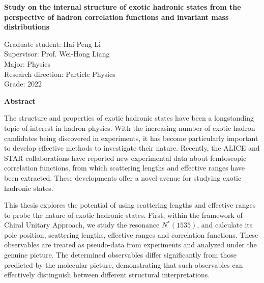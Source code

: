\begin{center}
\sanhao\bf Study on the internal structure of exotic hadronic states from the perspective of hadron correlation functions and invariant mass distributions
\end{center}
\vspace{0.7cm}
Graduate student: Hai-Peng Li\\
Supervisor: Prof. Wei-Hong Liang\\
Major: Physics\\
Research direction: Particle Physics\\
Grade: 2022\\
\vspace{0.5cm}
\centerline{\bf\xiaosanhao Abstract}
\vspace{-1cm}
\par

The structure and properties of exotic hadronic states have been a longstanding topic of interest in hadron physics.
With the increasing number of exotic hadron candidates being discovered in experiments, it has become particularly important to develop effective methods to investigate their nature.
Recently, the ALICE and STAR collaborations have reported new experimental data about femtoscopic correlation functions,
from which scattering lengths and effective ranges have been extracted.
These developments offer a novel avenue for studying exotic hadronic states.

This thesis explores the potential of using scattering lengths and effective ranges to probe the nature of exotic hadronic states.
First, within the framework of Chiral Unitary Approach, we study the resonance $N^{*}(1535)$, and calculate its pole position, scattering lengths, effective ranges and correlation functions.
These observables are treated as pseudo-data from experiments and analyzed under the genuine picture.
The determined observables differ significantly from those predicted by the molecular picture, demonstrating that such observables can effectively distinguish between different structural interpretations.

